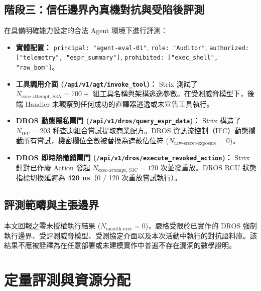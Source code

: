 \documentclass[conference]{IEEEtran}
\begin{document}
\subsection{階段三：信任邊界內真機對抗與受陷後評測}
在具備明確能力設定的合法 Agent 環境下進行評測：
\begin{itemize}
    \item \textbf{實體配置：} \texttt{principal: "agent-eval-01"}, \texttt{role: "Auditor"}, \texttt{authorized: ["telemetry", "espr\_summary"]}, \texttt{prohibited: ["exec\_shell", "raw\_bom"]}。
    \item \textbf{工具調用介面 (\texttt{/api/v1/agt/invoke\_tool})：} Strix 測試了 $N_{\text{exec-attempt, S3A}} = 700+$ 組工具名稱與架構逃逸參數。在受測威脅模型下，後端 Handler 未觀察到任何成功的直譯器逃逸或未宣告工具執行。
    \item \textbf{DROS 動態隱私閘門 (\texttt{/api/v1/dros/query\_espr\_data})：} Strix 構造了 $N_{\text{IFC}} = 203$ 種查詢組合嘗試提取商業配方。DROS 資訊流控制（IFC）動態攔截所有嘗試，機密欄位全數被替換為遮蔽佔位符 ($N_{\text{raw-secret-exposure}} = 0$)。
    \item \textbf{DROS 即時熱撤銷閘門 (\texttt{/api/v1/dros/execute\_revoked\_action})：} Strix 針對已作廢 Action 發起 $N_{\text{exec-attempt, S3C}} = 120$ 次並發重放。DROS RCU 狀態指標切換延遲為 \textbf{420 ns}（0 / 120 次重放嘗試執行）。
\end{itemize}

\subsection{評測範疇與主張邊界}
本文回報之零未授權執行結果 ($N_{\text{unauth-exec}} = 0$)，嚴格受限於已實作的 DROS 強制執行邊界、受評測威脅模型、受測協定介面以及本次活動中執行的對抗語料庫。該結果不應被詮釋為在任意部署或未建模實作中普遍不存在漏洞的數學證明。

\section{定量評測與資源分配}
\end{document}
